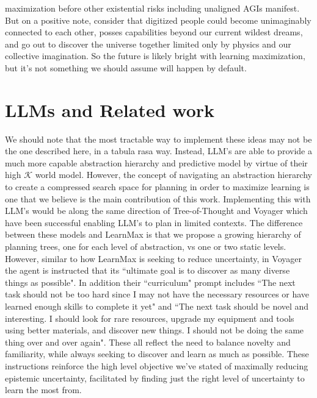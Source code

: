 \documentclass{article}
\begin{document}
maximization before other existential risks including unaligned AGIs manifest. But on a positive note, consider that digitized people could become unimaginably connected to each other, posses capabilities beyond our current wildest dreams, and go out to discover the universe together limited only by physics and our collective imagination. So the future is likely bright with learning maximization, but it's not something we should assume will happen by default.

\section{LLMs and Related work}
\label{sec:llm-related}

We should note that the most tractable way to implement these ideas may not be the one described here, in a tabula rasa way. Instead, LLM's \cite{openai2023gpt4} are able to provide a much more capable abstraction hierarchy and predictive model by virtue of their high $\mathcal{K}$ world model. However, the concept of navigating an abstraction hierarchy to create a compressed search space for planning in order to maximize learning is one that we believe is the main contribution of this work. Implementing this with LLM's would be along the same direction of Tree-of-Thought \cite{yao2023tree} and Voyager \cite{wang2023voyager} which have been successful enabling LLM's to plan in limited contexts. The difference between these models and LearnMax is that we propose a growing hierarchy of planning trees, one for each level of abstraction, vs one or two static levels. However, similar to how LearnMax is seeking to reduce uncertainty, in Voyager the agent is instructed that its \textquotedblleft ultimate goal is to discover as many diverse things as possible". In addition their \textquotedblleft curriculum" prompt includes \textquotedblleft The next task should not be too hard since I may not have the necessary resources or have learned enough skills to complete it yet" and \textquotedblleft The next task should be novel and interesting. I should look for rare resources, upgrade my equipment and tools using better materials, and discover new things. I should not be doing the same thing over and over again". These all reflect the need to balance novelty and familiarity, while always seeking to discover and learn as much as possible. These instructions reinforce the high level objective we've stated of maximally reducing epistemic uncertainty, facilitated by finding just the right level of uncertainty to learn the most from.
\end{document}
